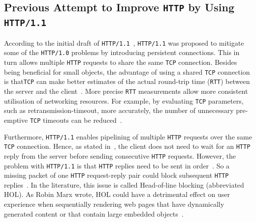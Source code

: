 \documentclass[12pt,a4paper]{report}
\begin{document}
\subsection{Previous Attempt to Improve \texttt{HTTP} by Using \texttt{HTTP/1.1}}

According to the initial draft of \texttt{HTTP/1.1}~\cite{RFC2068}, \texttt{HTTP/1.1} was proposed to mitigate some of the \texttt{HTTP/1.0} problems by introducing persistent connections.
This in turn allows multiple \texttt{HTTP} requests to share the same \texttt{TCP} connection.
Besides being beneficial for small objects, the advantage of using a shared \texttt{TCP} connection is that\texttt{TCP} can make better estimates of the actual round-trip time (\texttt{RTT}) between the server and the client~\cite{bib_Computer_Networking_L6}.
More precise \texttt{RTT} measurements allow more consistent utilisation of networking resources.
For example, by evaluating \texttt{TCP} parameters, such as retransmission-timeout, more accurately, the number of unnecessary pre-emptive \texttt{TCP} timeouts can be reduced~\cite{bib_rtt_tcp_Retransmissions}.

Furthermore, \texttt{HTTP/1.1} enables pipelining of multiple \texttt{HTTP} requests over the same \texttt{TCP} connection.
Hence, as stated in~\cite{bib_digital_ocean_http11_vs_http2}, the client does not need to wait for an \texttt{HTTP} reply from the server before sending consecutive \texttt{HTTP} requests.
However, the problem with \texttt{HTTP/1.1} is that \texttt{HTTP} replies need to be sent in order~\cite{RFC7540}. 
So a missing packet of one \texttt{HTTP} request-reply pair could block subsequent \texttt{HTTP} replies~\cite{bib_digital_ocean_http11_vs_http2, head-of-line-blocking-in-quic-and-http-3-the-details}.
In the literature, this issue is called Head-of-line blocking (abbreviated HOL).
As Robin Marx wrote, HOL could have a detrimental effect on user experience when sequentially rendering web pages that have dynamically generated content or that contain large embedded objects~\cite{head-of-line-blocking-in-quic-and-http-3-the-details}.
\end{document}
